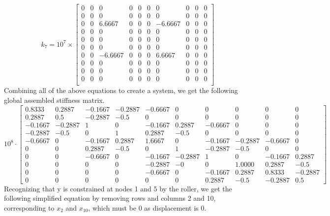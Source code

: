 \documentclass[8pt]{article}
\begin{document}
\[
k_7 = 10^7 \times
\begin{bmatrix}
0 & 0 & 0 & 0 & 0 & 0 & 0 & 0 & 0 & 0 \\
0 & 0 & 0 & 0 & 0 & 0 & 0 & 0 & 0 & 0 \\
0 & 0 & 6.6667 & 0 & 0 & 0 & -6.6667 & 0 & 0 & 0 \\
0 & 0 & 0 & 0 & 0 & 0 & 0 & 0 & 0 & 0 \\
0 & 0 & 0 & 0 & 0 & 0 & 0 & 0 & 0 & 0 \\
0 & 0 & 0 & 0 & 0 & 0 & 0 & 0 & 0 & 0 \\
0 & 0 & -6.6667 & 0 & 0 & 0 & 6.6667 & 0 & 0 & 0 \\
0 & 0 & 0 & 0 & 0 & 0 & 0 & 0 & 0 & 0 \\
0 & 0 & 0 & 0 & 0 & 0 & 0 & 0 & 0 & 0 \\
0 & 0 & 0 & 0 & 0 & 0 & 0 & 0 & 0 & 0 \\
\end{bmatrix}
\]
Combining all of the above equations to create a system, we get the following global assembled stiffness matrix.
\[
10^8 \cdot
\begin{bmatrix}
    0.8333 & 0.2887 & -0.1667 & -0.2887 & -0.6667 & 0 & 0 & 0 & 0 & 0 \\
    0.2887 & 0.5 & -0.2887 & -0.5 & 0 & 0 & 0 & 0 & 0 & 0 \\
    -0.1667 & -0.2887 & 1 & 0 & -0.1667 & 0.2887 & -0.6667 & 0 & 0 & 0 \\
    -0.2887 & -0.5 & 0 & 1 & 0.2887 & -0.5 & 0 & 0 & 0 & 0 \\
    -0.6667 & 0 & -0.1667 & 0.2887 & 1.6667 & 0 & -0.1667 & -0.2887 & -0.6667 & 0 \\
    0 & 0 & 0.2887 & -0.5 & 0 & 1 & -0.2887 & -0.5 & 0 & 0 \\
    0 & 0 & -0.6667 & 0 & -0.1667 & -0.2887 & 1 & 0 & -0.1667 & 0.2887 \\
    0 & 0 & 0 & 0 & -0.2887 & -0 & 0 & 1.0000 & 0.2887 & -0.5 \\
    0 & 0 & 0 & 0 & -0.6667 & 0 & -0.1667 & 0.2887 & 0.8333 & -0.2887 \\
    0 & 0 & 0 & 0 & 0 & 0 & 0.2887 & -0.5 & -0.2887 & 0.5
\end{bmatrix}
\]
Recognizing that y is constrained at nodes 1 and 5 by the roller, we get the following simplified equation by removing rows and columns 2 and 10, corresponding to \(x_2\) and \(x_{10}\), which must be 0 as displacement is 0.
\end{document}
